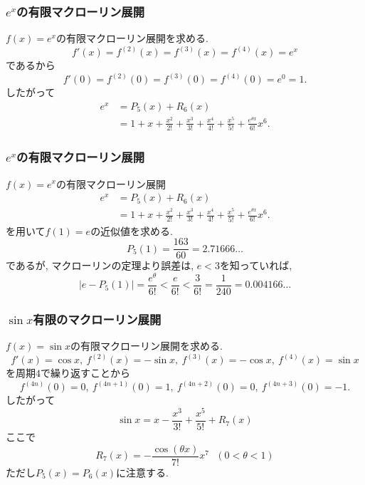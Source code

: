 \documentclass[dvipdfmx,cjk,10.2pt]{beamer}
\theoremstyle{definition}
\begin{document}
\begin{frame}
\frametitle{$e^x$の有限マクローリン展開}

$f(x)=e^x$の有限マクローリン展開を求める. 
$$
f'(x)=f^{(2)}(x)=f^{(3)}(x)=f^{(4)}(x)=e^x
$$
であるから
$$
f'(0)=f^{(2)}(0)=f^{(3)}(0)=f^{(4)}(0)=e^0=1. 
$$
したがって
\begin{align*}
e^x &= P_5(x)+R_6(x) \\
& = 1+x+\frac{x^2}{2!}+\frac{x^3}{3!}+\frac{x^4}{4!}+\frac{x^5}{5!}+\frac{e^{\theta x}}{6!}x^6. 
\end{align*}

\end{frame}






\begin{frame}
\frametitle{$e^x$の有限マクローリン展開}

$f(x)=e^x$の有限マクローリン展開
\begin{align*}
e^x &= P_5(x)+R_6(x) \\
& = 1+x+\frac{x^2}{2!}+\frac{x^3}{3!}+\frac{x^4}{4!}+\frac{x^5}{5!}+\frac{e^{\theta x}}{6!}x^6. 
\end{align*}
を用いて$f(1)=e$の近似値を求める. 
$$
P_5(1)=\frac{163}{60}=2.71666\dots
$$
であるが, マクローリンの定理より誤差は, $e<3$を知っていれば, 
$$
|e-P_5(1)|=\frac{e^\theta}{6!}<\frac{e}{6!}<\frac{3}{6!}=\frac{1}{240}=0.004166\dots
$$

\end{frame}






\begin{frame}
\frametitle{$\sin x$有限のマクローリン展開}

$f(x)=\sin x$の有限マクローリン展開を求める. 
$$
f'(x)=\cos x, \ f^{(2)}(x)=-\sin x, \ f^{(3)}(x)=-\cos x, \ f^{(4)}(x)=\sin x
$$
を周期$4$で繰り返すことから
$$
 f^{(4n)}(0)=0, \ f^{(4n+1)}(0)=1, \ f^{(4n+2)}(0)=0, \ f^{(4n+3)}(0)=-1. 
$$
したがって
$$
\sin x =x-\frac{x^3}{3!}+\frac{x^5}{5!}+R_7(x)
$$
ここで
$$
R_7(x)=- \frac{\cos (\theta x)}{7!}x^7 \ \ \ (0 < \theta <1)
$$
ただし$P_5(x)=P_6(x)$に注意する. 
\end{frame}
\end{document}

